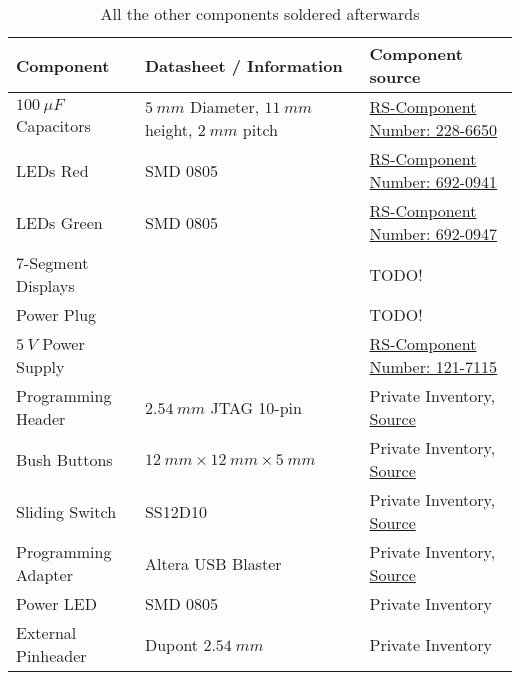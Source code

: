 \begin{table}[h!]
	\centering
	\begin{tabular}{|p{4.9cm}|p{4.9cm}|p{4.9cm}|}
		\hline
		Component & Datasheet / Information & Component source\\
		\hline
		$\SI{100}{\mu{}F}$ Capacitors & $\SI{5}{mm}$ Diameter, $\SI{11}{mm}$ height, $\SI{2}{mm}$ pitch & \href{https://de.rs-online.com/web/p/aluminium-elektrolytkondensatoren/2286650}{RS-Component Number: 228-6650} \\
		\hline
		LEDs Red & SMD 0805 & \href{https://de.rs-online.com/web/p/leds/6920941}{RS-Component Number: 692-0941} \\
		\hline
		LEDs Green & SMD 0805 & \href{https://de.rs-online.com/web/p/leds/6920947}{RS-Component Number: 692-0947} \\
		\hline
		7-Segment Displays & & TODO! \\
		\hline
		Power Plug & & TODO! \\
		\hline
		$\SI{5}{V}$ Power Supply & & \href{https://de.rs-online.com/web/p/steckernetzteile/1217115}{RS-Component Number: 121-7115} \\
		\hline
		Programming Header & $\SI{2,54}{mm}$ JTAG 10-pin & Private Inventory, \href{https://www.amazon.de/dp/B00R1LS3QY}{Source} \\
		\hline
		Bush Buttons & $\SI{12}{mm} \times \SI{12}{mm} \times \SI{5}{mm}$ & Private Inventory, \href{https://de.aliexpress.com/item/32726177349.html}{Source} \\
		\hline
		Sliding Switch & SS12D10 & Private Inventory, \href{https://de.aliexpress.com/item/4001325159135.html}{Source} \\
		\hline
		Programming Adapter & Altera USB Blaster & Private Inventory, \href{https://de.aliexpress.com/item/1005006124817358.html}{Source} \\
		\hline
		Power LED & SMD 0805 & Private Inventory \\
		\hline
		External Pinheader & Dupont $\SI{2.54}{mm}$ & Private Inventory \\
		\hline
	\end{tabular}
	\caption{All the other components soldered afterwards}
	\label{tab:components_other}
\end{table}
